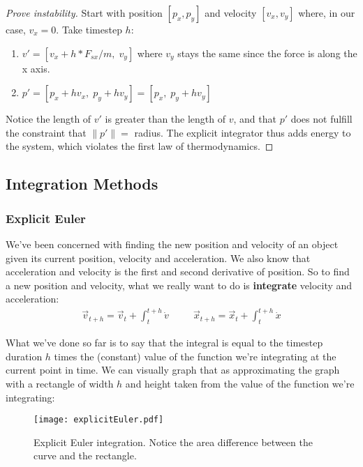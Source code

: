\documentclass[]{article}
\begin{document}
\begin{proof}[Prove instability]
Start with position $[p_x, p_y]$ and velocity $[v_x, v_y]$ where, in our case, $v_x = 0$. Take timestep $h$:
\begin{enumerate}
	\item $v' = [v_x + h*F_{sx}/m,\; v_y]$ where $v_y$ stays the same since the force is along the x axis.
	\item $p' = [p_x + hv_x,\; p_y + hv_y] = [p_x,\; p_y + hv_y]$
\end{enumerate}
Notice the length of $v'$ is greater than the length of $v$, and that $p'$ does not fulfill the constraint that $\parallel p'\parallel = $ radius. The explicit integrator thus adds energy to the system, which violates the first law of thermodynamics.
\end{proof}

\subsection{Integration Methods}

\subsubsection{Explicit Euler}

We've been concerned with finding the new position and velocity of an object given its current position, velocity and acceleration. We also know that acceleration and velocity is the first and second derivative of position. So to find a new position and velocity, what we really want to do is \textbf{integrate} velocity and acceleration:
\begin{eqnarray}
	\vec{v}_{t+h} = \vec{v}_t + \int_t^{t+h}\dot{v} \;\;\;\;\;\;\;\;\; 	\vec{x}_{t+h} = \vec{x}_t + \int_t^{t+h}\dot{x}
\end{eqnarray}

What we've done so far is to say that the integral is equal to the timestep duration $h$ times the (constant) value of the function we're integrating at the current point in time. We can visually graph that as approximating the graph with a rectangle of width $h$ and height taken from the value of the function we're integrating:

\begin{figure}[htp]
    \centering
    \texttt{[image: explicitEuler.pdf]}
    \caption{Explicit Euler integration. Notice the area difference between the curve and the rectangle.}
	\label{EulerOvershootGraph}
\end{figure}
\end{document}
